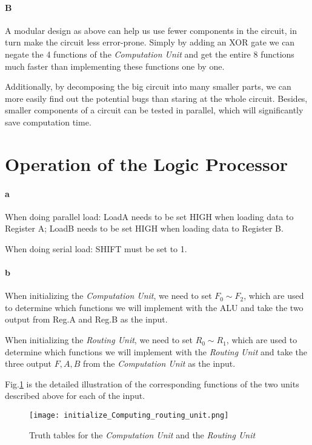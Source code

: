 \documentclass[12pt]{article}
\begin{document}
\paragraph{B}
A modular design as above can help us use fewer components in the circuit, in turn make the circuit less error-prone. Simply by adding an XOR gate we can negate the 4 functions of the \textit{Computation Unit} and get the entire 8 functions much faster than implementing these functions one by one.

Additionally, by decomposing the big circuit into many smaller parts, we can more easily find out the potential bugs than staring at the whole circuit. Besides, smaller components of a circuit can be tested in parallel, which will significantly save computation time. 

\section{Operation of the Logic Processor}
\paragraph{a}
When doing parallel load: LoadA needs to be set HIGH when loading data to Register A; LoadB needs to be set HIGH when loading data to Register B.

When doing serial load: SHIFT must be set to 1.
\paragraph{b}
When initializing the \textit{Computation Unit}, we need to set $F_0\sim F_2$, which are used to determine which functions we will implement with the ALU and take the two output from Reg.A and Reg.B as the input.

When initializing the \textit{Routing Unit}, we need to set $R_0\sim R_1$, which are used to determine which functions we will implement with the \textit{Routing Unit} and take the three output $F,A,B$ from the \textit{Computation Unit} as the input.

Fig.\ref{Computation and routing} is the detailed illustration of the corresponding functions of the two units described above for each of the input.
\begin{figure}[h]
    \centering
    \texttt{[image: initialize\_Computing\_routing\_unit.png]}
    \caption{Truth tables for the \textit{Computation Unit} and the \textit{Routing Unit}}
    \label{Computation and routing}
\end{figure}
\end{document}

